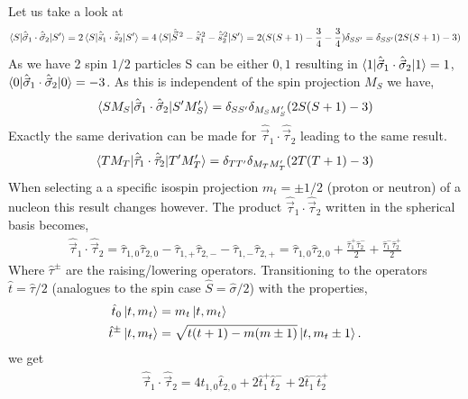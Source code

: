 \documentclass[10pt]{article}
\begin{document}
Let us take a look at
\begin{align*}
	\braket{ S | \hat{ \vec{\sigma}}_{1} \cdot \hat{ \vec{\sigma}}_{2} | 
S'} = 2 \braket{ S | \hat{ \vec{s}}_{1} \cdot \hat{ \vec{s}}_{2} | S'} = 4 
\braket{ S | \hat{\vec{S}}^{\, 2} - \hat{\vec{s}}_{1}^{\,2} - 
\hat{\vec{s}}_{2}^{\,2} | S'} = 2 ( S(S+1) - \frac{3}{4} - \frac{3}{4} ) 
\delta_{SS'} = \delta_{SS'} (2 S(S+1) - 3)
\end{align*}
As we have 2 spin $1/2$ particles S can be either $0,1$ resulting in $\braket{ 
1 | \hat{ \vec{\sigma}}_{1} \cdot \hat{ \vec{\sigma}}_{2} | 1} = 1$, $\braket{ 0 
| \hat{ \vec{\sigma}}_{1} \cdot \hat{ \vec{\sigma}}_{2} | 0} = -3$.
 As this is independent of 
the spin projection $M_S$ we have,
\begin{align*}
	\braket{ S M_S | \hat{ \vec{\sigma}}_{1} \cdot \hat{ \vec{\sigma}}_{2} 
| S' M_S'} = \delta_{SS'} \delta_{M_S M_S'} (2 S(S+1) - 3)
\end{align*}
Exactly the same derivation can be made for $\hat{\vec{\tau}}_{1} \cdot 
\hat{\vec{\tau}}_{2}$ leading to the same result.
\begin{align*}
	\braket{ T M_T | \hat{\vec{\tau}}_{1} \cdot \hat{\vec{\tau}}_{2} | T' 
M_T'} = \delta_{TT'} \delta_{M_T M_T'} (2 T(T+1) - 3)
\end{align*}
When selecting a a specific isospin projection $m_t = \pm 1/2 $ (proton or 
neutron) of a nucleon this result changes however.
The product $\hat{\vec{\tau}}_{1} \cdot \hat{\vec{\tau}}_{2}$ written in the 
spherical basis becomes,
\begin{align*}
	\hat{\vec{\tau}}_{1} \cdot \hat{\vec{\tau}}_{2} = \hat{\tau}_{1,0} 
\hat{\tau}_{2,0} - \hat{\tau}_{1,+} \hat{\tau}_{2,-} - \hat{\tau}_{1,-} 
\hat{\tau}_{2,+} = \hat{\tau}_{1,0} \hat{\tau}_{2,0} + \frac{\hat{\tau}_{1}^{+} 
\hat{\tau}_{2}^{-}}{2} + \frac{ \hat{\tau}_{1}^{-} \hat{\tau}_{2}^{+}}{2}
\end{align*}
Where $\hat{\tau}^{\pm}$ are the raising/lowering operators. Transitioning to 
the operators $\hat{t} = \hat{\tau}/2$ (analogues to the spin case $\hat{S} = 
\hat{\sigma}/2$) with the properties,
\begin{align*}
\hat{t}_0 \ket{ t, m_t} &= m_t \ket{ t, m_t} \\
\hat{t}^{\pm} \ket{ t, m_t} &= \sqrt{ t(t+1) - m(m \pm 1)} \ket { t, m_t \pm 1}.
\end{align*}
we get
\begin{align*}
	\hat{\vec{\tau}}_{1} \cdot \hat{\vec{\tau}}_{2} = 4 \hat{t}_{1,0} 
\hat{t}_{2,0} + 2 \hat{t}_{1}^{+} \hat{t}_{2}^{-} + 2 \hat{t}_{1}^{-} 
\hat{t}_{2}^{+} 
\end{align*}
\end{document}
